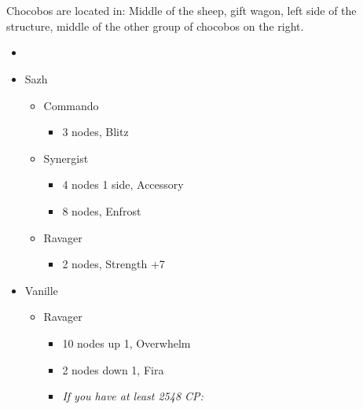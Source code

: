 \chapter[Chapter 8]{}

\begin{multicols}{2}
Chocobos are located in: Middle of the sheep, gift wagon, left side of the structure, middle of the other group of chocobos on the right. 
\begin{menu}
\begin{itemize}
    \paradigm
    \begin{itemize}
        \item {}%
{\paradigmline[1]{\textit{\com}}{\textit{\rav}}{}}%
{\paradigmline{(\com)}{(\med)}{}}%
{\paradigmline{\syn}{\sab}{}}%
{\paradigmline{\rav}{\rav}{}}%
{\paradigmline{\rav}{\sab}{}}%
{\paradigmline{\com}{\sab}{}}
    \end{itemize}
    \crystarium
    \begin{itemize}
        \item Sazh
        \begin{itemize}
            \item Commando
            \begin{itemize}
                \item 3 nodes, Blitz
            \end{itemize}
            \item Synergist
            \begin{itemize}
                \item 4 nodes 1 side, Accessory
                \item 8 nodes, Enfrost
            \end{itemize}
            \item Ravager
            \begin{itemize}
                \item 2 nodes, Strength +7
            \end{itemize}
        \end{itemize}
        \item Vanille
        \begin{itemize}
            \item Ravager
            \begin{itemize}
                \item 10 nodes up 1, Overwhelm
                \item 2 nodes down 1, Fira
                \item \textit{If you have at least 2548 CP:}

\end{itemize}
\end{itemize}
\end{itemize}
\end{itemize}
\end{menu}
\end{multicols}
